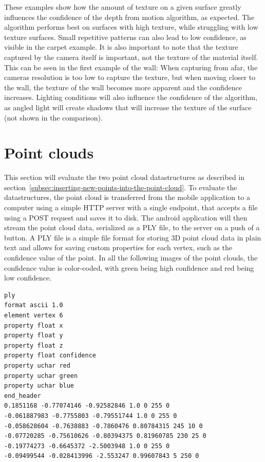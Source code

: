 These examples show how the amount of texture on a given surface greatly influences the confidence of the depth from motion algorithm, as expected.
The algorithm performs best on surfaces with high texture, while struggling with low texture surfaces.
Small repetitive patterns can also lead to low confidence, as visible in the carpet example.
It is also important to note that the texture captured by the camera itself is important, not the texture of the material itself.
This can be seen in the first example of the wall: When capturing from afar, the cameras resolution is too low to capture the texture,
but when moving closer to the wall, the texture of the wall becomes more apparent and the confidence increases.
Lighting conditions will also influence the confidence of the algorithm,
as angled light will create shadows that will increase the texture of the surface~\cite{google_llc_arcore_doc} (not shown in the comparison).

\section{Point clouds}\label{sec:point-clouds}
This section will evaluate the two point cloud datastructures as described in section~\ref{subsec:inserting-new-points-into-the-point-cloud}.
To evaluate the datastructures, the point cloud is transferred from the mobile application to a computer using
a simple HTTP server with a single endpoint, that accepts a file using a POST request and saves it to disk.
The android application will then stream the point cloud data, serialized as a PLY file, to the server on a push of a button.
A PLY file is a simple file format for storing 3D point cloud data in plain text
and allows for saving custom properties for each vertex, such as the confidence value of the point.
In all the following images of the point clouds, the confidence value is color-coded,
with green being high confidence and red being low confidence.

\begin{lstlisting}[caption=Example PLY file]
ply
format ascii 1.0
element vertex 6
property float x
property float y
property float z
property float confidence
property uchar red
property uchar green
property uchar blue
end_header
0.1851168 -0.77074146 -0.92582846 1.0 0 255 0
-0.061887983 -0.7755803 -0.79551744 1.0 0 255 0
-0.058628604 -0.7638883 -0.7860476 0.80784315 245 10 0
-0.07720285 -0.75610626 -0.80394375 0.81960785 230 25 0
-0.19774273 -0.6645372 -2.5003948 1.0 0 255 0
-0.09499544 -0.028413996 -2.553247 0.99607843 5 250 0
\end{lstlisting}

